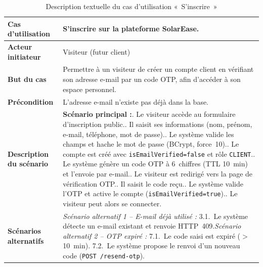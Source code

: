 \begin{table}[H]
  \caption{Description textuelle du cas d'utilisation «~S'inscrire~»}
  \label{tab:cu-sinscrire}
  \centering
  \begin{tabularx}{\textwidth}{|L{3.8cm}|X|}
    \hline
    \textbf{Cas d'utilisation} & S'inscrire sur la plateforme SolarEase. \\
    \hline
    \textbf{Acteur initiateur} & Visiteur (futur client) \\
    \hline
    \textbf{But du cas} & Permettre à un visiteur de créer un compte client en vérifiant son adresse e-mail par un code OTP, afin d'accéder à son espace personnel. \\
    \hline
    \textbf{Précondition} & L'adresse e-mail n'existe pas déjà dans la base. \\
    \hline
    \textbf{Description du scénario} &
    \textbf{Scénario principal :}. Le visiteur accède au formulaire d'inscription public.. Il saisit ses informations (nom, prénom, e-mail, téléphone, mot de passe).. Le système valide les champs et hache le mot de passe (BCrypt, force~10).. Le compte est créé avec \texttt{isEmailVerified=false} et rôle \texttt{CLIENT}.. Le système génère un code OTP à 6~chiffres (TTL 10~min) et l'envoie par e-mail.. Le visiteur est redirigé vers la page de vérification OTP.. Il saisit le code reçu.. Le système valide l'OTP et active le compte (\texttt{isEmailVerified=true}).. Le visiteur peut alors se connecter.\\
    \hline
    \textbf{Scénarios alternatifs} &
    \textit{Scénario alternatif 1 -- E-mail déjà utilisé :}\newline
    \hspace*{6pt}3.1.~Le système détecte un e-mail existant et renvoie HTTP~409.\newline[2pt]
    \textit{Scénario alternatif 2 -- OTP expiré :}\newline
    \hspace*{6pt}7.1.~Le code saisi est expiré ($>$10~min).\newline
    \hspace*{6pt}7.2.~Le système propose le renvoi d'un nouveau code (\texttt{POST /resend-otp}).\\
    \hline
  \end{tabularx}
\end{table}

